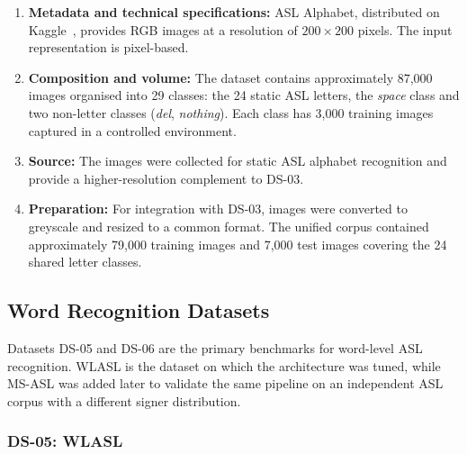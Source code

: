\begin{enumerate}
    \item \textbf{Metadata and technical specifications:} ASL Alphabet, distributed on Kaggle~\cite{aslalphabet}, provides RGB images at a resolution of $200
              \times 200$ pixels. The input representation is pixel-based.

    \item \textbf{Composition and volume:} The dataset contains approximately 87,000 images organised into 29 classes: the 24 static ASL
          letters, the \textit{space} class and two non-letter classes (\textit{del}, \textit{nothing}). Each
          class has 3,000 training images captured in a controlled environment.

    \item \textbf{Source:} The images were collected for static ASL alphabet recognition and provide a higher-resolution
          complement to DS-03.

    \item \textbf{Preparation:} For integration with DS-03, images were converted to greyscale and resized to a common format. The
          unified corpus contained approximately 79,000 training images and 7,000 test images covering the 24
          shared letter classes.

\end{enumerate}

\subsection{Word Recognition Datasets}
\label{subsec:datasets_wr}

Datasets DS-05 and DS-06 are the primary benchmarks for word-level ASL recognition. WLASL is the
dataset on which the architecture was tuned, while MS-ASL was added later to validate the same
pipeline on an independent ASL corpus with a different signer distribution.

\subsubsection*{DS-05: WLASL}

